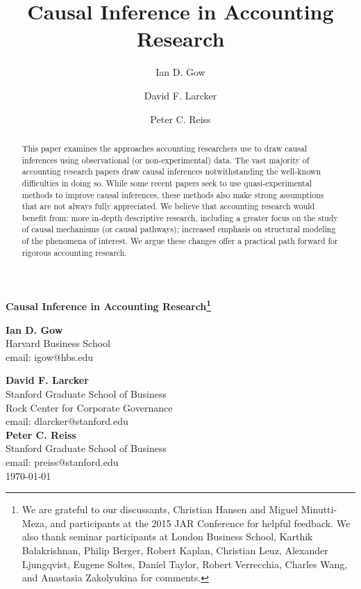\documentclass[12pt,reqno,titlepage]{amsart}
\title[Causal Inference in Accounting]{Causal Inference in Accounting Research}
\author{Ian D. Gow}
\author{David F. Larcker}
\author{Peter C. Reiss}
\theoremstyle{definition}
\begin{document}
\usetikzlibrary{automata, shapes, calc, positioning}



\begin{titlepage}
  \centering
  	\begin{large}
  	\textbf{Causal Inference in Accounting Research\footnote{We are grateful to our discussants, Christian Hansen and Miguel Minutti-Meza, and participants at the 2015 JAR Conference for helpful feedback. 
  	We also thank seminar participants at London Business School, Karthik Balakrishnan, Philip Berger, Robert Kaplan, Christian Leuz, Alexander Ljungqvist, Eugene Soltes, Daniel Taylor, Robert Verrecchia, Charles Wang, and Anastasia Zakolyukina for comments.}} \\	
  	\end{large}
  	\vspace{60pt}
	\textbf{Ian D. Gow} \\
	Harvard Business School \\
	email: igow@hbs.edu

  	\vspace{30pt}
	\textbf{David F. Larcker} \\
	Stanford Graduate School of Business \\
	Rock Center for Corporate Governance \\
	email: dlarcker@stanford.edu \\
		
	\vspace{30pt}
	\textbf{Peter C. Reiss} \\
	Stanford Graduate School of Business \\
	email: preiss@stanford.edu \\

	\vspace{30pt}
	\today

\end{titlepage}

\begin{abstract}
	This paper examines the approaches accounting researchers use to draw causal inferences using observational (or non-experimental) data. 
	The vast majority of accounting research papers draw causal inferences notwithstanding the well-known difficulties in doing so.
	While some recent papers seek to use quasi-experimental methods to improve causal inferences, these methods also make strong assumptions that are not always fully
	appreciated.
We believe that accounting research would benefit from: 
		 more in-depth descriptive research, including a greater focus on the study of causal mechanisms (or causal pathways); 
		increased emphasis on structural modeling of the phenomena of interest. 
We argue these changes offer a practical path forward for rigorous accounting research. 
\end{abstract}
\end{document}
